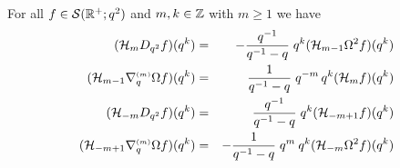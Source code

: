 \begin{lemma} \label{lemma:auxH:qdiff}
For all $f\in {\mathcal S}(\mathbb{R}^+;q^2)$ and $m,k\in \mathbb{Z}$ with $m\geq 1$ we have
\begin{eqnarray}
({\mathcal H}_{m} D_{q^2} f)(q^k)
      &=& -\frac{q^{-1}}{q^{-1}-q} \; q^k ({\mathcal H}_{m-1} \Omega^2 f)(q^k)
       \label{eq:auxH:Dq2:pos}\\
({\mathcal H}_{m-1} \nabla_q^{\scriptscriptstyle (m)} \Omega f)(q^k)
      &=& \frac{1}{q^{-1}-q} \; q^{-m}\, q^k ({\mathcal H}_{m} f)(q^k)
       \label{eq:auxH:nabq:pos} \\
({\mathcal H}_{-m} D_{q^2} f)(q^k)
      &=&  \frac{q^{-1}}{q^{-1}-q} \; q^k ({\mathcal H}_{-m+1} f)(q^k)
       \label{eq:auxH:Dq2:neg} \\
({\mathcal H}_{-m+1} \nabla_q^{\scriptscriptstyle (m)} \Omega f)(q^k)
      &=& -\frac{1}{q^{-1}-q} \; q^m\: q^k ({\mathcal H}_{-m} \Omega^2 f)(q^k)
      \label{eq:auxH:nabq:neg}
\end{eqnarray}
\end{lemma}
